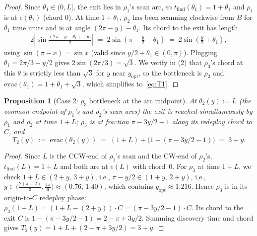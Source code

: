 \documentclass[11pt]{article}
\theoremstyle{plain}
\newtheorem{proposition}[theorem]{Proposition}
\theoremstyle{definition}
\theoremstyle{remark}
\begin{document}
\begin{proof}
Since $\theta_1 \in (0, L]$, the exit lies in $\rho_1$'s scan arc, so
$t_{\mathrm{find}}(\theta_1) = 1 + \theta_1$ and $\rho_1$ is at
$e(\theta_1)$ (chord $0$). At time $1 + \theta_1$, $\rho_2$ has been
scanning clockwise from $B$ for $\theta_1$ time units and is at angle
$(2\pi - y) - \theta_1$. Its chord to the exit has length
\begin{align*}
2\!\left|\sin\!\tfrac{(2\pi - y - \theta_1) - \theta_1}{2}\right|
\;=\; 2\sin\!\left(\pi - \tfrac{y}{2} - \theta_1\right)
\;=\; 2\sin\!\left(\tfrac{y}{2} + \theta_1\right),
\end{align*}
using $\sin(\pi - x) = \sin x$ (valid since $y/2 + \theta_1 \in (0,
\pi)$). Plugging $\theta_1 = 2\pi/3 - y/2$ gives $2\sin(2\pi/3) = \sqrt
3$. We verify in (2) that $\rho_3$'s chord at this
$\theta$ is strictly less than $\sqrt 3$ for $y$ near
$y_{\mathrm{opt}}$, so the bottleneck is $\rho_2$ and $\mathrm{evac}(\theta_1)
= 1 + \theta_1 + \sqrt 3$, which simplifies to~\eqref{eq:T1}.
\end{proof}

\begin{proposition}[Case 2: $\rho_3$ bottleneck at the arc midpoint]
\label{prop:case2}
At $\theta_2(y) := L$ (the common endpoint of $\rho_1$'s and $\rho_2$'s
scan arcs) the exit is reached simultaneously by $\rho_1$ and $\rho_2$
at time $1 + L$; $\rho_3$ is at fraction $\pi - 3y/2 - 1$ along its
redeploy chord to $C$, and
\begin{equation}
\label{eq:T2}
T_2(y) \;:=\; \mathrm{evac}(\theta_2(y))
\;=\; (1 + L) + \bigl(1 - (\pi - 3y/2 - 1)\bigr)
\;=\; 3 + y.
\end{equation}
\end{proposition}

\begin{proof}
Since $L$ is the CCW-end of $\rho_1$'s scan and the CW-end of $\rho_2$'s,
$t_{\mathrm{find}}(L) = 1 + L$ and both are at $e(L)$ with chord~$0$. For
$\rho_3$ at time $1 + L$, we check $1 + L \in (2+y,\, 3+y)$, i.e.,
$\pi - y/2 \in (1+y,\, 2+y)$, i.e., $y \in \bigl(\frac{2(\pi-2)}{3},
\frac{4\pi}{9}\bigr) \approx (0.76,\, 1.40)$, which contains
$y_{\mathrm{opt}} \approx 1.216$. Hence $\rho_3$ is in its origin-to-$C$
redeploy phase: $\rho_3(1 + L) = (1 + L - (2+y)) \cdot C = (\pi - 3y/2 -
1) \cdot C$. Its chord to the exit $C$ is $1 - (\pi - 3y/2 - 1) = 2 -
\pi + 3y/2$. Summing discovery time and chord gives $T_2(y) = 1 + L +
(2 - \pi + 3y/2) = 3 + y$.
\end{proof}
\end{document}

